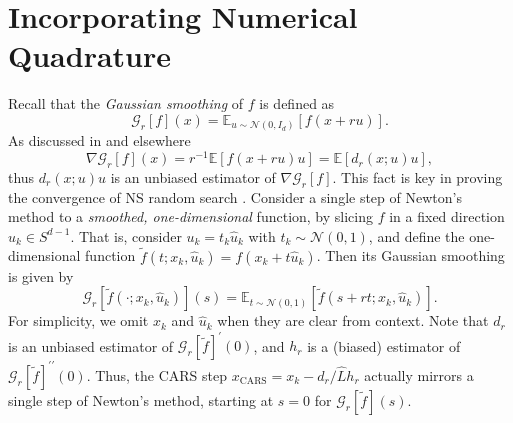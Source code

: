 \section{Incorporating Numerical Quadrature}
\label{section: CARS-NQ}
Recall that the {\em Gaussian smoothing} of $f$ is defined as
\begin{equation*}
    \mathcal{G}_{r}[f](x) = \mathbb{E}_{u \sim \mathcal{N}(0, I_d)}[f(x + r u)].
\end{equation*}
As discussed in \cite{nesterov2017random} and elsewhere
\begin{equation*}
    \nabla\mathcal{G}_{r}[f] (x) = r^{-1}\mathbb{E}[f(x+r u)u] =  \mathbb{E}[d_{r}(x; u)u],
\end{equation*}
thus $d_{r}(x; u)u$ is an unbiased estimator of $\nabla\mathcal{G}_{r}[f]$. This fact is key in proving the convergence of NS random search \cite{nesterov2017random}. 
Consider a single step of Newton's method to a {\em smoothed, one-dimensional} function, by slicing $f$ in a fixed direction $\hat{u}_k \in S^{d-1}$. That is, consider $u_k = t_k\hat{u}_k$ with $t_k \sim \mathcal{N}(0,1)$, and define the one-dimensional function $\tilde{f}(t;x_k,\hat{u}_k) = f(x_k + t\hat{u}_k)$.
Then its Gaussian smoothing is given by
\begin{equation*}
    \mathcal{G}_{r}[\tilde{f}(\cdot;x_k,\hat{u}_k)](s) = \mathbb{E}_{t\sim \mathcal{N}(0,1)} [ \tilde{f} (s+r t;x_k,\hat{u}_k)].
\end{equation*}
For simplicity, we omit $x_k$ and $\hat{u}_k$ when they are clear from context. Note that $d_{r}$ is an unbiased estimator of $\mathcal{G}_{r}[\tilde{f}]^{\prime}(0)$, and $h_{r}$ is a (biased) estimator of $\mathcal{G}_{r}[\tilde{f}]^{\prime\prime}(0)$. Thus, the CARS step $x_{\mathrm{CARS}} = x_{k} - d_{r}/\hat{L}h_{r}$ actually mirrors a single step of Newton's method, starting at $s=0$ for $\mathcal{G}_{r}[\tilde{f}](s)$.

